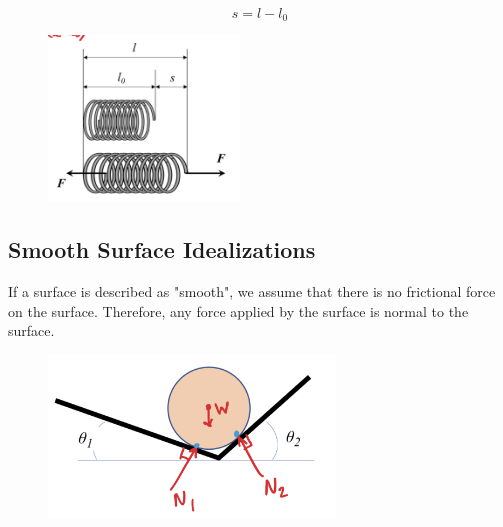 \[{s} = {l-l_0}\]

\begin{figure}[!h]
\centering
\includegraphics[angle=0, width=2in]{FBDFigures/SpringAssumptions.png}
\vspace{-2mm}
\caption{\small {}}
\vspace{-3mm}
\label{Fig:SpringAssumptions}
\end{figure}

\subsection{Smooth Surface Idealizations}

If a surface is described as "smooth", we assume that there is no frictional force on the surface. Therefore, any force applied by the surface is normal to the surface. 

\begin{figure}[!h]
\centering
\includegraphics[angle=0, width=3in]{FBDFigures/SmoothAssumptions.png}
\vspace{-2mm}
\caption{\small {}}
\vspace{-3mm}
\label{Fig:SmoothAssumptions}
\end{figure}


